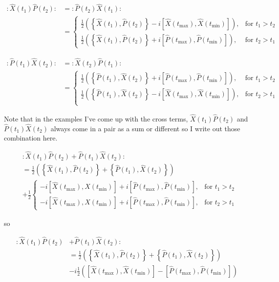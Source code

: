 \documentclass[12pt]{article}
\begin{document}
\begin{align}
:\hat{X}(t_1)\hat{P}(t_2): &= :\hat{P}(t_2)\hat{X}(t_1):\\
&= 
\begin{cases}
\frac{1}{2}\left(\left\{\hat{X}(t_1),\hat{P}(t_2)\right\} - i \left[\hat{X}(t_{\text{max}}),\hat{X}(t_{\text{min}})\right]\right), &\text{for } t_1>t_2\\
\frac{1}{2}\left(\left\{\hat{X}(t_1),\hat{P}(t_2)\right\} + i \left[\hat{P}(t_{\text{max}}),\hat{P}(t_{\text{min}})\right]\right), &\text{for } t_2>t_1
\end{cases}
\end{align}

\begin{align}
:\hat{P}(t_1)\hat{X}(t_2): &= :\hat{X}(t_2)\hat{P}(t_1):\\
&= 
\begin{cases}
\frac{1}{2}\left(\left\{\hat{P}(t_1),\hat{X}(t_2)\right\} + i \left[\hat{P}(t_{\text{max}}),\hat{P}(t_{\text{min}})\right]\right), &\text{for } t_1>t_2\\
\frac{1}{2}\left(\left\{\hat{P}(t_1),\hat{X}(t_2)\right\} - i \left[\hat{X}(t_\text{max}),\hat{X}(t_{\text{min}})\right]\right), &\text{for } t_2>t_1\\
\end{cases}
\end{align}

Note that in the examples I've come up with the cross terms, $\hat{X}(t_1)\hat{P}(t_2)$ and $\hat{P}(t_1)\hat{X}(t_2)$ always come in a pair as a sum or different so I write out those combination here.

\begin{align}
&:\hat{X}(t_1)\hat{P}(t_2) + \hat{P}(t_1)\hat{X}(t_2):\\
&=\frac{1}{2} \left(\left\{\hat{X}(t_1),\hat{P}(t_2)\right\} + \left\{\hat{P}(t_1),\hat{X}(t_2)\right\}\right)\\
&+\frac{1}{2}\begin{cases}
-i\left[\hat{X}(t_{\text{max}}),\hat{X}(t_{\text{min}})\right] +i\left[\hat{P}(t_{\text{max}}),\hat{P}(t_{\text{min}})\right],& \text{for } t_1>t_2\\
-i\left[\hat{X}(t_{\text{max}}),\hat{X}(t_{\text{min}})\right] +i\left[\hat{P}(t_{\text{max}}),\hat{P}(t_{\text{min}})\right],& \text{for } t_2>t_1
\end{cases}
\end{align}

so

\begin{align}
:\hat{X}(t_1)\hat{P}(t_2) &+ \hat{P}(t_1)\hat{X}(t_2):\\
&= \frac{1}{2} \left(\left\{\hat{X}(t_1),\hat{P}(t_2)\right\} + \left\{\hat{P}(t_1),\hat{X}(t_2)\right\}\right)\\
&-i\frac{1}{2}\left(\left[\hat{X}(t_\text{max}),\hat{X}(t_\text{min})\right] -\left[\hat{P}(t_\text{max}),\hat{P}(t_\text{min})\right]\right)
\end{align}
\end{document}
